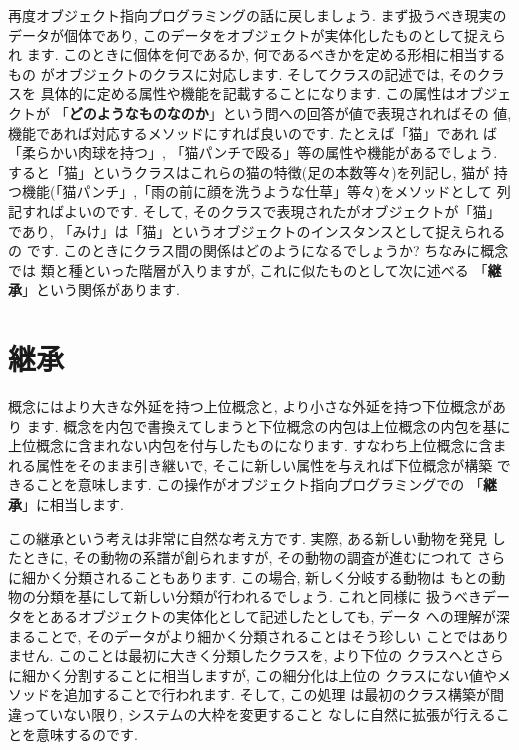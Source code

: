 再度オブジェクト指向プログラミングの話に戻しましょう. まず扱うべき現実の
データが個体であり, このデータをオブジェクトが実体化したものとして捉えられ
ます. このときに個体を何であるか, 何であるべきかを定める形相に相当するもの
がオブジェクトのクラスに対応します. そしてクラスの記述では, そのクラスを
具体的に定める属性や機能を記載することになります. この属性はオブジェクトが
「\textbf{どのようなものなのか}」という問への回答が値で表現されればその
値,  機能であれば対応するメソッドにすれば良いのです. たとえば「猫」であれ
ば「柔らかい肉球を持つ」, 「猫パンチで殴る」等の属性や機能があるでしょう.
 すると「猫」というクラスはこれらの猫の特徴(足の本数等々)を列記し, 猫が
持つ機能(「猫パンチ」,「雨の前に顔を洗うような仕草」等々)をメソッドとして
列記すればよいのです. そして, そのクラスで表現されたがオブジェクトが「猫」
であり, 「みけ」は「猫」というオブジェクトのインスタンスとして捉えられるの
です. このときにクラス間の関係はどのようになるでしょうか? ちなみに概念では
類と種といった階層が入りますが, これに似たものとして次に述べる
「\textbf{継承}」という関係があります.


\section{継承}


概念にはより大きな外延を持つ上位概念と, より小さな外延を持つ下位概念があり
ます. 概念を内包で書換えてしまうと下位概念の内包は上位概念の内包を基に
上位概念に含まれない内包を付与したものになります. すなわち上位概念に含ま
れる属性をそのまま引き継いで, そこに新しい属性を与えれば下位概念が構築
できることを意味します. この操作がオブジェクト指向プログラミングでの
「\textbf{継承}」に相当します.
\newline


この継承という考えは非常に自然な考え方です. 実際, ある新しい動物を発見
したときに, その動物の系譜が創られますが, その動物の調査が進むにつれて
さらに細かく分類されることもあります. この場合, 新しく分岐する動物は
もとの動物の分類を基にして新しい分類が行われるでしょう. これと同様に
扱うべきデータをとあるオブジェクトの実体化として記述したとしても, データ
への理解が深まることで, そのデータがより細かく分類されることはそう珍しい
ことではありません. このことは最初に大きく分類したクラスを, より下位の
クラスへとさらに細かく分割することに相当しますが, この細分化は上位の
クラスにない値やメソッドを追加することで行われます. そして, この処理
は最初のクラス構築が間違っていない限り, システムの大枠を変更すること
なしに自然に拡張が行えることを意味するのです.
\newline


